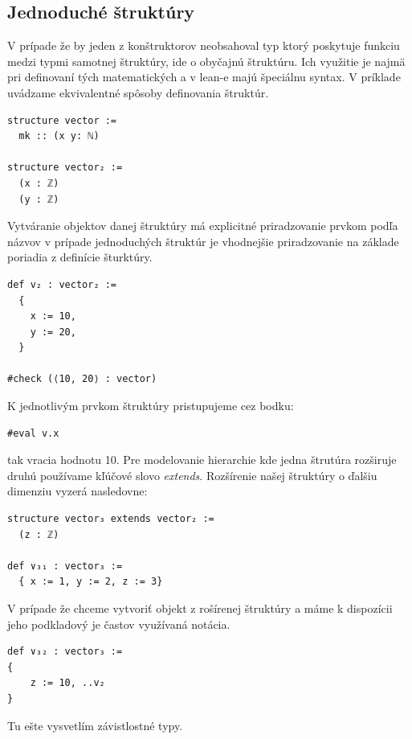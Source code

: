 \documentclass[a4paper,10pt,oneside]{report}%
\begin{document}
\subsection{Jednoduché štruktúry}
    V prípade že by jeden z konštruktorov neobsahoval typ ktorý poskytuje funkciu
medzi typmi samotnej štruktúry, ide o obyčajnú štruktúru.
    Ich využitie je najmä pri definovaní tých matematických a v lean-e majú
špeciálnu syntax.
    V príklade uvádzame ekvivalentné spôsoby definovania štruktúr.
\begin{lstlisting}
structure vector :=
  mk :: (x y: ℕ)

structure vector₂ :=
  (x : ℤ)
  (y : ℤ)
\end{lstlisting}
    Vytváranie objektov danej štruktúry má explicitné priradzovanie prvkom
podľa názvov v prípade jednoduchých štruktúr je vhodnejšie priradzovanie na
základe poriadia z definície šturktúry.
\begin{lstlisting}
def v₂ : vector₂ :=
  {
    x := 10,
    y := 20,
  }

#check (⟨10, 20⟩ : vector)
\end{lstlisting}
    K jednotlivým prvkom štruktúry pristupujeme cez bodku:
\begin{lstlisting}
#eval v.x
\end{lstlisting}
    tak vracia hodnotu 10.
    Pre modelovanie hierarchie kde jedna štrutúra rozširuje druhú používame
kľúčové slovo \emph{extends}.
    Rozšírenie našej štruktúry o ďalšiu dimenziu vyzerá nasledovne:
\begin{lstlisting}
structure vector₃ extends vector₂ :=
  (z : ℤ)

def ∨₃₁ : vector₃ :=
  { x := 1, y := 2, z := 3}
\end{lstlisting}
    V prípade že chceme vytvoriť objekt z rošírenej štruktúry a máme k dispozícii
jeho podkladový je častov využívaná notácia.
\begin{lstlisting}
def ∨₃₂ : vector₃ :=
{
    z := 10, ..v₂
}
\end{lstlisting}

Tu ešte vysvetlím závistlostné typy.
\end{document}
